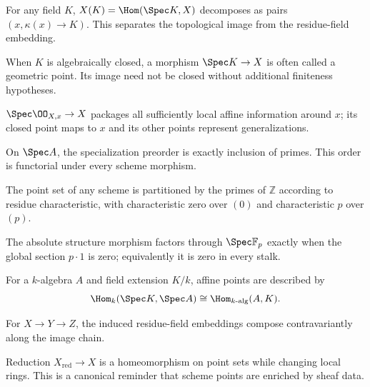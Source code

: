\begin{example}\label{ex:vi21-ae01}
For any field $K$, $X(K)=\Hom(\Spec K,X)$ decomposes as pairs $(x,\kappa(x)\to K)$.  This separates the topological image from the residue-field embedding.
\end{example}
\begin{example}\label{ex:vi21-ae02}
When $K$ is algebraically closed, a morphism $\Spec K\to X$ is often called a geometric point.  Its image need not be closed without additional finiteness hypotheses.
\end{example}
\begin{example}\label{ex:vi21-ae03}
$\Spec\OO_{X,x}\to X$ packages all sufficiently local affine information around $x$; its closed point maps to $x$ and its other points represent generalizations.
\end{example}
\begin{example}\label{ex:vi21-ae04}
On $\Spec A$, the specialization preorder is exactly inclusion of primes.  This order is functorial under every scheme morphism.
\end{example}
\begin{example}\label{ex:vi21-ae05}
The point set of any scheme is partitioned by the primes of $\mathbb Z$ according to residue characteristic, with characteristic zero over $(0)$ and characteristic $p$ over $(p)$.
\end{example}
\begin{example}\label{ex:vi21-ae06}
The absolute structure morphism factors through $\Spec\mathbb F_p$ exactly when the global section $p\cdot1$ is zero; equivalently it is zero in every stalk.
\end{example}
\begin{example}\label{ex:vi21-ae07}
For a $k$-algebra $A$ and field extension $K/k$, affine points are described by
\[
\Hom_k(\Spec K,\Spec A)\cong\Hom_{k\text{-alg}}(A,K).
\]
\end{example}
\begin{example}\label{ex:vi21-ae08}
For $X\to Y\to Z$, the induced residue-field embeddings compose contravariantly along the image chain.
\end{example}
\begin{example}\label{ex:vi21-ae09}
Reduction $X_{\mathrm{red}}\to X$ is a homeomorphism on point sets while changing local rings.  This is a canonical reminder that scheme points are enriched by sheaf data.
\end{example}
